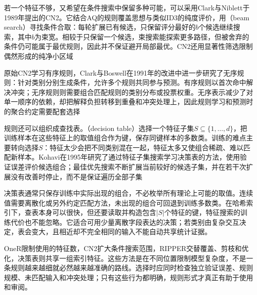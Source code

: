 若一个特征不够，又希望在条件搜索中保留多种可能，可以采用Clark与Niblett于1989年提出的CN2。它结合AQ的规则覆盖思想与类似ID3的纯度评价，用（beam search）寻找条件合取：每轮扩展已有候选，只保留评分最好的$b$个候选继续搜索，其中$b$为束宽。相较于只保留一个候选，束搜索能探索更多路径，但被舍弃的条件仍可能属于最优规则，因此并不保证避开局部最优。CN2还用显著性筛选限制偶然形成的纯净小区域

原始CN2学习有序规则，Clark与Boswell在1991年的改进中进一步研究了无序规则：针对类别分别生成条件，允许多个规则共同参与预测。有序规则以首次命中解决冲突；无序规则则需要组合匹配规则的类别分布或投票权重。无序表示减少了对单一顺序的依赖，却把解释负担转移到重叠和冲突处理上，因此规则学习和预测时的聚合约定需要配套选择

规则还可以组织成查找表。（decision table）选择一个特征子集$S\subseteq\{1,\ldots,d\}$，把训练样本在这些特征上的取值组合作为键，保存同键样本的多数类。训练的难点主要转向选择$S$：特征太少会把不同类别混在一起，特征太多又使组合稀疏、难以匹配新样本。Kohavi在1995年研究了通过特征子集搜索学习决策表的方法，使用验证误差评价候选组合；最佳优先搜索不断扩展当前较好的候选子集，并在若干次扩展没有改善时停止，而不是保证遍历全部子集

决策表通常只保存训练中实际出现的组合，不必枚举所有理论上可能的取值。连续值需要离散化或另外约定匹配方法，未出现的组合可回退到训练多数类。在哈希索引下，查表本身可以很快，但还要读取并构造包含$|S|$个特征的键，特征搜索的训练代价也不能忽略。它适合可用少量离散字段表达的决策；若类别由复杂交互决定，表会变大，且相近却不完全相同的输入不能自动共享统计证据。

OneR限制使用的特征数，CN2扩大条件搜索范围，RIPPER交替覆盖、剪枝和优化，决策表则共享一组索引特征。这些方法是在不同位置限制模型复杂度，不是一条规则越来越细就必然越来越准确的路线。选择时应同时检查独立验证误差、规则规模、未匹配输入和冲突处理；只有这些行为都明确，规则形式才真正有助于使用和审阅。
